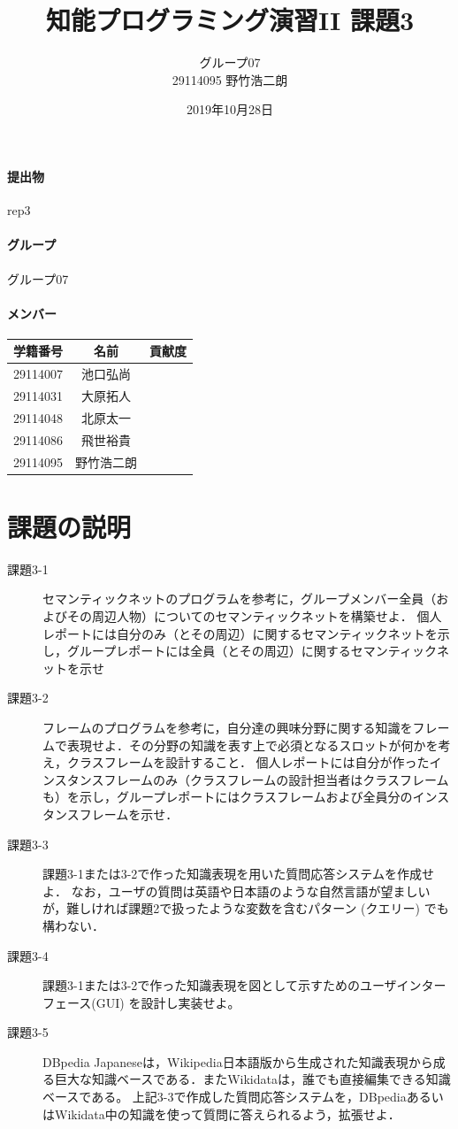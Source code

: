 \documentclass[a4j]{jarticle}
\title{知能プログラミング演習II 課題3}
\author{グループ07\\
  29114095 野竹浩二朗\\
}
\date{2019年10月28日}
\begin{document}
\maketitle

\paragraph{提出物} rep3
\paragraph{グループ} グループ07
\paragraph{メンバー}
\begin{tabular}{|c|c|c|}
  \hline\hline
  学籍番号&名前&貢献度\\
  \hline\hline
  29114007&池口弘尚&\\
  \hline
  29114031&大原拓人&\\
  \hline
  29114048&北原太一&\\
  \hline
  29114086&飛世裕貴&\\
  \hline
  29114095&野竹浩二朗&\\
  \hline
\end{tabular}



\section{課題の説明}
\begin{description}
\item[課題3-1] セマンティックネットのプログラムを参考に，グループメンバー全員（およびその周辺人物）についてのセマンティックネットを構築せよ．
個人レポートには自分のみ（とその周辺）に関するセマンティックネットを示し，グループレポートには全員（とその周辺）に関するセマンティックネットを示せ

\item[課題3-2] フレームのプログラムを参考に，自分達の興味分野に関する知識をフレームで表現せよ．その分野の知識を表す上で必須となるスロットが何かを考え，クラスフレームを設計すること．
個人レポートには自分が作ったインスタンスフレームのみ（クラスフレームの設計担当者はクラスフレームも）を示し，グループレポートにはクラスフレームおよび全員分のインスタンスフレームを示せ．
\item[課題3-3] 課題3-1または3-2で作った知識表現を用いた質問応答システムを作成せよ．
なお，ユーザの質問は英語や日本語のような自然言語が望ましいが，難しければ課題2で扱ったような変数を含むパターン (クエリー) でも構わない．

\item[課題3-4]課題3-1または3-2で作った知識表現を図として示すためのユーザインターフェース(GUI) を設計し実装せよ。
\item[課題3-5] DBpedia Japaneseは，Wikipedia日本語版から生成された知識表現から成る巨大な知識ベースである．またWikidataは，誰でも直接編集できる知識ベースである。
上記3-3で作成した質問応答システムを，DBpediaあるいはWikidata中の知識を使って質問に答えられるよう，拡張せよ．

\end{description}
\end{document}

